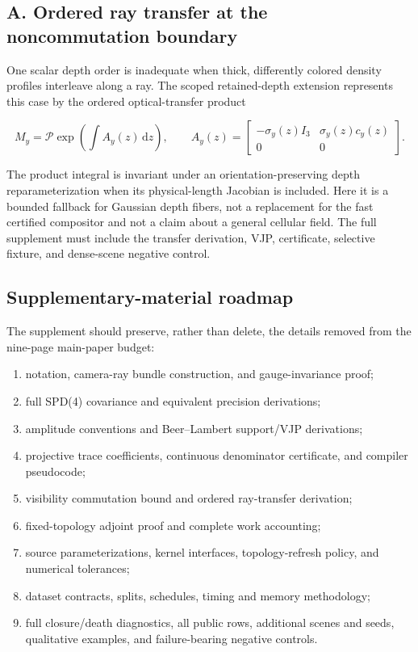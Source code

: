 \documentclass[
]{article}
\providecommand{\tightlist}{%
  \setlength{\itemsep}{0pt}\setlength{\parskip}{0pt}}
\begin{document}
\appendix

\subsection{A. Ordered ray transfer at the noncommutation
boundary}\label{a.-ordered-ray-transfer-at-the-noncommutation-boundary}

One scalar depth order is inadequate when thick, differently colored
density profiles interleave along a ray. The scoped retained-depth
extension represents this case by the ordered optical-transfer product

\[
  M_y=\mathcal P\exp\!\left(\int A_y(z)\,\mathrm dz\right),\qquad
  A_y(z)=
  \begin{bmatrix}
    -\sigma_y(z)I_3 & \sigma_y(z)c_y(z)\\
    0 & 0
  \end{bmatrix}.
  \tag{13}
\]

The product integral is invariant under an orientation-preserving depth
reparameterization when its physical-length Jacobian is included. Here
it is a bounded fallback for Gaussian depth fibers, not a replacement
for the fast certified compositor and not a claim about a general
cellular field. The full supplement must include the transfer
derivation, VJP, certificate, selective fixture, and dense-scene
negative control.

\subsection{Supplementary-material
roadmap}\label{supplementary-material-roadmap}

The supplement should preserve, rather than delete, the details removed
from the nine-page main-paper budget:

\begin{enumerate}
\def\labelenumi{\arabic{enumi}.}
\tightlist
\item
  notation, camera-ray bundle construction, and gauge-invariance proof;
\item
  full SPD(4) covariance and equivalent precision derivations;
\item
  amplitude conventions and Beer--Lambert support/VJP derivations;
\item
  projective trace coefficients, continuous denominator certificate, and
  compiler pseudocode;
\item
  visibility commutation bound and ordered ray-transfer derivation;
\item
  fixed-topology adjoint proof and complete work accounting;
\item
  source parameterizations, kernel interfaces, topology-refresh policy,
  and numerical tolerances;
\item
  dataset contracts, splits, schedules, timing and memory methodology;
\item
  full closure/death diagnostics, all public rows, additional scenes and
  seeds, qualitative examples, and failure-bearing negative controls.
\end{enumerate}
\end{document}
